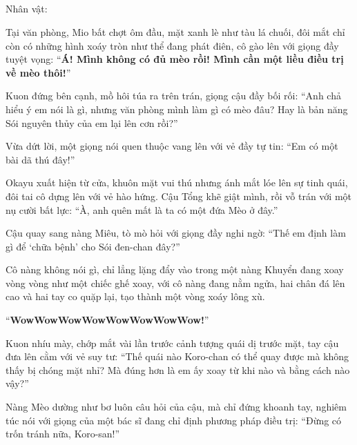 \documentclass[../main.tex]{subfiles}
\begin{document}
\newpage

\subsection*{\label{ep-S13.VI}}
\begin{center}
  {\caviar\fontsize{12pt}{12pt}\selectfont Nhân vật:    }
\end{center}

Tại văn phòng, Mio bất chợt ôm đầu, mặt xanh lè như tàu lá chuối, đôi mắt chỉ còn có những hình xoáy tròn như thể đang phát điên, cô gào lên với giọng đầy tuyệt vọng: ``\textbf{Á! Mình không có đủ mèo rồi! Mình cần một liều điều trị về mèo thôi!}''

Kuon đứng bên cạnh, mồ hôi túa ra trên trán, giọng cậu đầy bối rối: ``Anh chả hiểu ý em nói là gì, nhưng văn phòng mình làm gì có mèo đâu? Hay là bản năng Sói nguyên thủy của em lại lên cơn rồi?''

Vừa dứt lời, một giọng nói quen thuộc vang lên với vẻ đầy tự tin: ``Em có một bài dã thú đây!''


Okayu xuất hiện từ cửa, khuôn mặt vui thú nhưng ánh mắt lóe lên sự tinh quái, đôi tai cô dựng lên với vẻ hào hứng. Cậu Tổng khẽ giật mình, rồi vỗ trán với một nụ cười bất lực: ``À, anh quên mất là ta có một đứa Mèo ở đây.''

Cậu quay sang nàng Miêu, tò mò hỏi với giọng đầy nghi ngờ: ``Thế em định làm gì để `chữa bệnh' cho Sói đen-chan đây?''

Cô nàng không nói gì, chỉ lẳng lặng đẩy vào trong một nàng Khuyển đang xoay vòng vòng như một chiếc ghế xoay, với cô nàng đang nằm ngửa, hai chân đá lên cao và hai tay co quặp lại, tạo thành một vòng xoáy lông xù.


``\textbf{WowWowWowWowWowWowWowWow!}''

Kuon nhíu mày, chớp mắt vài lần trước cảnh tượng quái dị trước mặt, tay cậu đưa lên cằm với vẻ suy tư: ``Thế quái nào Koro-chan có thể quay được mà không thấy bị chóng mặt nhỉ? Mà đúng hơn là em ấy xoay từ khi nào và bằng cách nào vậy?''

Nàng Mèo dường như bơ luôn câu hỏi của cậu, mà chỉ đứng khoanh tay, nghiêm túc nói với giọng của một bác sĩ đang chỉ định phương pháp điều trị: ``Đừng có trốn tránh nữa, Koro-san!''
\end{document}
